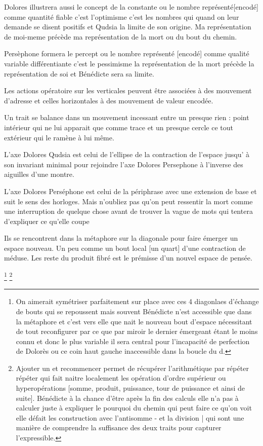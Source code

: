 \documentclass{article}
\begin{document}

Dolores illustrera aussi le concept de la constante ou le nombre représenté[encodé]  comme quantité fiable  c'est l'optimisme c'est les nombres qui quand on leur demande se disent positifs et Qudsia la limite de son origine. Ma représentation de moi-meme précède ma représentation de la mort ou du bout du chemin.

Persèphone formera le percept  ou le nombre représenté [encodé] comme qualité  variable différentiante c'est le pessimisme la représentation de la mort précède la représentation de soi et Bénédicte sera sa limite.


 Les actions opératoire sur les verticales peuvent être associées à des mouvement d'adresse et celles horizontales  à des mouvement de valeur encodée.





Un trait se balance dans un mouvement incessant  entre un presque rien :  point intérieur qui ne lui apparait que comme trace et un presque cercle ce tout extérieur qui le ramène à lui même.

L'axe Dolores Qudsia est celui de l'ellipse de la contraction de l'espace jusqu' à son invariant minimal pour rejoindre l'axe Dolores Persephone à l'inverse des aiguilles d'une montre. 

L'axe Dolores Perséphone est celui de la périphrase avec une extension de base et suit le sens des horloges. Mais n'oubliez pas qu'on peut ressentir  la mort comme  une interruption  de quelque chose  avant de trouver la vague de  mots qui tentera d'expliquer ce qu'elle coupe 

Ils  se rencontrent dans la métaphore sur la diagonale pour faire émerger un espace nouveau.
Un peu comme un bout local [un quart] d'une contraction de méduse.  Les reste du produit fibré est le prémisse d'un nouvel espace de pensée.

\footnote{On aimerait symétriser parfaitement sur place avec  ces 4 diagonlaes d'échange de bouts qui se repoussent mais souvent  Bénédicte n'est accessible que dans la métaphore et c'est vers elle que nait le nouveau bout d'espace nécessitant de tout reconfigurer par ce que par miroir le dernier émergeant étant le moins connu et donc le plus variable il sera central pour l'incapacité de perfection de Dolorès ou ce coin haut gauche inaccessible dans la boucle du d.}
\footnote{  Ajouter un et recommencer permet de récupérer l'arithmétique par répéter répéter qui fait naitre localement les opération d'ordre supérieur ou  hyperopérations [somme, produit, puissance, tour de puissance et ainsi de suite]. Bénédicte à la chance d'être après la fin des calculs elle n'a pas à calculer juste à expliquer le pourquoi du chemin qui peut faire ce qu'on voit elle défait les construction avec l'antisomme - et la division | qui sont une manière de  comprendre la suffisance des deux traits pour capturer l'expressible.} 
\end{document}
